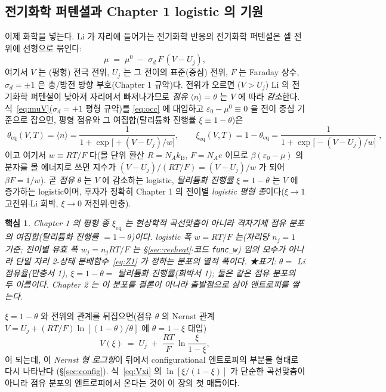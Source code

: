 \documentclass[11pt,a4paper]{article}
\newtheorem*{keybox}{핵심}
\newcommand{\eq}{\mathrm{eq}}
\newcommand{\kB}{k_{\mathrm B}}
\newcommand{\avg}[1]{\langle #1\rangle}
\begin{document}
\subsection{전기화학 퍼텐셜과 Chapter 1 logistic 의 기원}\label{ssec:logistic}
이제 화학을 넣는다. Li 가 자리에 들어가는 전기화학 반응의 전기화학 퍼텐셜은 셀 전위에 선형으로 묶인다:
\begin{equation}
\mu \;=\; \mu^0 \;-\; \sigma_d\,F\,(V-U_j),
\label{eq:muV}
\end{equation}
여기서 $V$ 는 (평형) 전극 전위, $U_j$ 는 그 전이의 표준(중심) 전위, $F$ 는 Faraday 상수, $\sigma_d=\pm1$ 은
충/방전 방향 부호(Chapter 1 규약)다. 전위가 오르면 ($V>U_j$) Li 의 전기화학 퍼텐셜이 낮아져 자리에서
빠져나가므로 \emph{점유} $\avg{n}=\theta$ 는 $V$ 에 따라 \emph{감소}한다. 식~\eqref{eq:muV}($\sigma_d=+1$ 평형
규약)를 \eqref{eq:occ} 에 대입하고 $\varepsilon_0-\mu^0\equiv0$ 을 전이 중심 기준으로 잡으면, 평형 점유와 그
여집합(탈리튬화 진행률 $\xi\equiv1-\theta$)은
\begin{equation}
\boxed{\;\theta_\eq(V,T)=\avg{n}=\frac{1}{1+\exp\!\bigl[+(V-U_j)/w\bigr]},\qquad
\xi_\eq(V,T)=1-\theta_\eq=\frac{1}{1+\exp\!\bigl[-(V-U_j)/w\bigr]}\;,}
\label{eq:logistic}
\end{equation}
이고 여기서 $w\equiv RT/F$ 다(몰 단위 환산 $R=N_A\kB$, $F=N_A e$ 이므로 $\beta(\varepsilon_0-\mu)$ 의 분자를
몰 에너지로 쓰면 지수가 $(V-U_j)/(RT/F)=(V-U_j)/w$ 가 되어 $\beta F=1/w$). 곧 \emph{점유} $\theta$ 는 $V$ 에
감소하는 logistic, \emph{탈리튬화 진행률} $\xi=1-\theta$ 는 $V$ 에 증가하는 logistic이며, 후자가 정확히
Chapter 1 의 전이별 \emph{logistic 평형 종}이다($\xi\to1$ 고전위$\cdot$Li 희박, $\xi\to0$ 저전위$\cdot$만충).

\begin{keybox}
Chapter 1 의 평형 종 $\xi_\eq$ 는 \emph{현상학적 곡선맞춤}이 아니라 \emph{격자기체 점유 분포의 여집합}(탈리튬화
진행률 $=1-\theta$)이다. logistic 폭 $w=RT/F$ 는(자리당 $n_j{=}1$ 기준; 전이별 유효 폭 $w_j=n_jRT/F$ 는 \S\ref{sec:revheat}$\cdot$코드 \texttt{func\_w}) 임의 모수가 아니라 단일 자리 2-상태 분배함수~\eqref{eq:Z1} 가
정하는 분포의 열적 폭이다. ★표기: $\theta=$ Li 점유율(만충서 1), $\xi=1-\theta=$ 탈리튬화 진행률(희박서 1);
둘은 같은 점유 분포의 두 이름이다. Chapter 2 는 이 분포를 결론이 아니라 출발점으로 삼아 엔트로피를 쌓는다.
\end{keybox}

$\xi=1-\theta$ 와 전위의 관계를 뒤집으면(점유 $\theta$ 의 Nernst 관계 $V=U_j+(RT/F)\ln[(1-\theta)/\theta]$ 에
$\theta=1-\xi$ 대입)
\begin{equation}
V(\xi) \;=\; U_j \;+\; \frac{RT}{F}\,\ln\!\frac{\xi}{1-\xi},
\label{eq:Vxi}
\end{equation}
이 되는데, 이 \emph{Nernst 형 로그항}이 뒤에서 configurational 엔트로피의 부분몰 형태로 다시 나타난다
(\S\ref{sec:config}). 식~\eqref{eq:Vxi} 의 $\ln[\xi/(1-\xi)]$ 가 단순한 곡선맞춤이 아니라 점유 분포의
엔트로피에서 온다는 것이 이 장의 첫 매듭이다.
\end{document}
